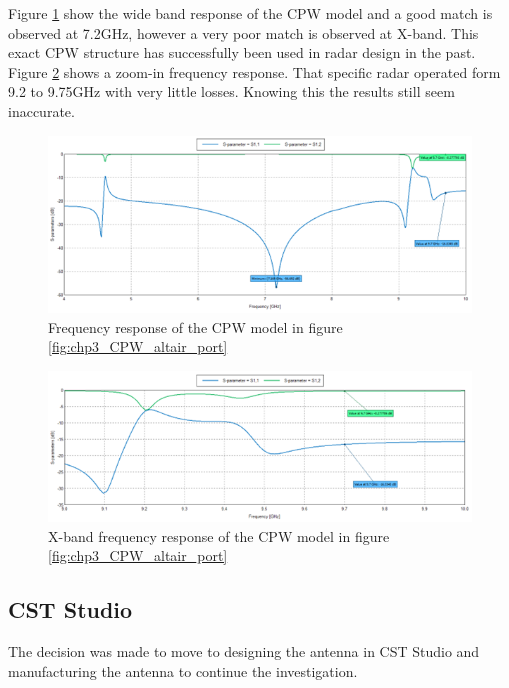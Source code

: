 Figure \ref{fig:chp3_CPW_altair_port_results} show the wide band response of the CPW model and a good match is observed at 7.2GHz, however a very poor match is observed at X-band. This exact CPW structure has successfully been used in radar design in the past. Figure \ref{fig:chp3_CPW_altair_port_results_zoom} shows a zoom-in frequency response.  That specific radar operated form 9.2 to 9.75GHz with very little losses. Knowing this the results still seem inaccurate.

    \begin{figure}[H]
    \centering
    \includegraphics[width=0.9\linewidth]{Figures/chp3_CPW_altair_port_results.png}
    \caption{Frequency response of the CPW model in figure \ref{fig:chp3_CPW_altair_port}}
    \label{fig:chp3_CPW_altair_port_results}
    \end{figure}

    \begin{figure}[H]
    \centering
    \includegraphics[width=0.9\linewidth]{Figures/chp3_CPW_altair_port_results_zoom.png}
    \caption{X-band frequency response of the CPW model in figure \ref{fig:chp3_CPW_altair_port}}
    \label{fig:chp3_CPW_altair_port_results_zoom}
    \end{figure}

\subsection{CST Studio}
The decision was made to move to designing the antenna in CST Studio and manufacturing the antenna to continue the investigation. 

